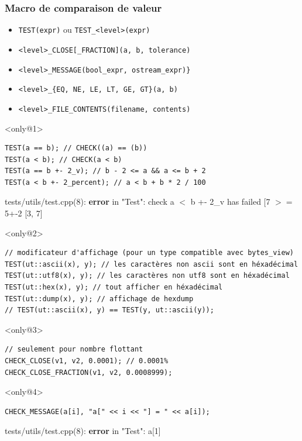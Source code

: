 \documentclass{beamer}
\begin{document}
\begin{frame}[fragile]
\frametitle{Macro de comparaison de valeur}
\begin{itemize}[<+->]
 \item \lstinline|TEST(expr)| ou \lstinline|TEST_<level>(expr)|
 \item \lstinline|<level>_CLOSE[_FRACTION](a, b, tolerance)|
 \item \lstinline|<level>_MESSAGE(bool_expr, ostream_expr)}|
 \item \lstinline|<level>_{EQ, NE, LE, LT, GE, GT}(a, b)|
 \item \lstinline|<level>_FILE_CONTENTS(filename, contents)|
\end{itemize}

\begin{exampleblock}{}<only@1>
\begin{lstlisting}
TEST(a == b); // CHECK((a) == (b))
TEST(a < b); // CHECK(a < b)
TEST(a == b +- 2_v); // b - 2 <= a && a <= b + 2
TEST(a < b +- 2_percent); // a < b + b * 2 / 100
\end{lstlisting}
{\color{f7}tests/utils/test.cpp(8)}: \textbf{\color{f1}error} in "{\color{f5}Test}":
 {\color{f4}check} {\color{f1}a} {\color{f3}$<$} {\color{f1}b +- 2\_v has}
 failed [{\color{f6}7} {\color{f3}$>=$} {\color{f6}5+-2 [3, 7]}
\end{exampleblock}

\begin{exampleblock}{}<only@2>
\begin{lstlisting}
// modificateur d'affichage (pour un type compatible avec bytes_view)
TEST(ut::ascii(x), y); // les caractères non ascii sont en héxadécimal
TEST(ut::utf8(x), y); // les caractères non utf8 sont en héxadécimal
TEST(ut::hex(x), y); // tout afficher en héxadécimal
TEST(ut::dump(x), y); // affichage de hexdump
// TEST(ut::ascii(x), y) == TEST(y, ut::ascii(y));
\end{lstlisting}
\end{exampleblock}

\begin{exampleblock}{}<only@3>
\begin{lstlisting}
// seulement pour nombre flottant
CHECK_CLOSE(v1, v2, 0.0001); // 0.0001%
CHECK_CLOSE_FRACTION(v1, v2, 0.0008999);
\end{lstlisting}
\end{exampleblock}

\begin{exampleblock}{}<only@4>
\begin{lstlisting}
CHECK_MESSAGE(a[i], "a[" << i << "] = " << a[i]);
\end{lstlisting}
{\color{f7}tests/utils/test.cpp(8)}: \textbf{\color{f1}error} in "{\color{f5}Test}": {\color{f4}a[1]}
\end{exampleblock}


\end{frame}
\end{document}
